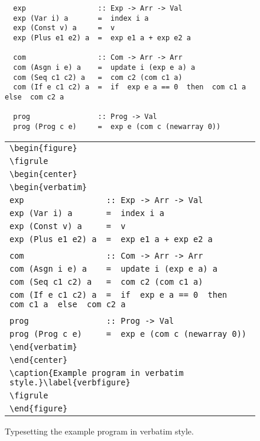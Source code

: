 \documentclass{jfp1}
\begin{document}
\begin{figure}
\figrule
\begin{verbatim}
  exp                 :: Exp -> Arr -> Val
  exp (Var i) a       =  index i a
  exp (Const v) a     =  v
  exp (Plus e1 e2) a  =  exp e1 a + exp e2 a

  com                 :: Com -> Arr -> Arr
  com (Asgn i e) a    =  update i (exp e a) a
  com (Seq c1 c2) a   =  com c2 (com c1 a)
  com (If e c1 c2) a  =  if  exp e a == 0  then  com c1 a  else  com c2 a

  prog                :: Prog -> Val
  prog (Prog c e)     =  exp e (com c (newarray 0))
\end{verbatim}
\caption{Example program in verbatim style.}\label{verbfigure}
\figrule
\begin{tabular}{l}
\verb|\begin{figure}| \\
\verb|\figrule| \\
\verb|\begin{center}| \\
\verb|\begin{verbatim}| \\
\verb|exp                 :: Exp -> Arr -> Val| \\
\verb|exp (Var i) a       =  index i a| \\
\verb|exp (Const v) a     =  v| \\
\verb|exp (Plus e1 e2) a  =  exp e1 a + exp e2 a| \\
\\
\verb|com                 :: Com -> Arr -> Arr| \\
\verb|com (Asgn i e) a    =  update i (exp e a) a| \\
\verb|com (Seq c1 c2) a   =  com c2 (com c1 a)| \\
\verb|com (If e c1 c2) a  =  if  exp e a == 0  then  com c1 a  else  com c2 a| \\
\\
\verb|prog                :: Prog -> Val| \\
\verb|prog (Prog c e)     =  exp e (com c (newarray 0))| \\
\verb|\end{verbatim}| \\
\verb|\end{center}| \\
\verb|\caption{Example program in verbatim style.}\label{verbfigure}| \\
\verb|\figrule| \\
\verb|\end{figure}|
\end{tabular}
\caption{Typesetting the example program in verbatim style.}\label{verbtypeset}
\figrule
\end{figure}
\end{document}
